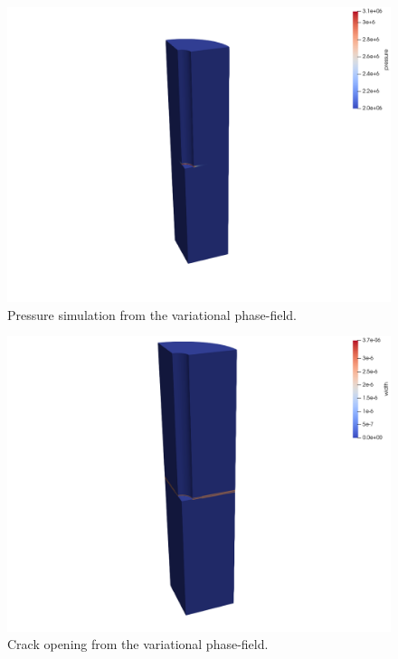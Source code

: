\begin{figure}
\centering
\includegraphics[width=1\linewidth]{figures/Keita_ME9_pres.png}
\caption{Pressure simulation from the variational phase-field.}
\label{fig:ME9_pressrue_VPF}
\end{figure}
\begin{figure}
\centering
\includegraphics[width=1\linewidth]{figures/Keita_ME9_width.png}
\caption{Crack opening from the variational phase-field.}
\label{fig:ME9_width_VPF}
\end{figure}



